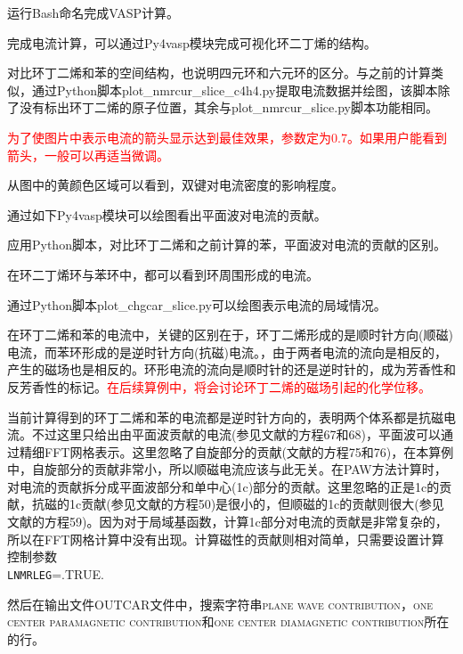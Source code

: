运行\textrm{Bash}命名完成\textrm{VASP}计算。

完成电流计算，可以通过\textrm{Py4vasp}模块完成可视化环二丁烯的结构。

对比环丁二烯和苯的空间结构，也说明四元环和六元环的区分。与之前的计算类似，通过\textrm{Python}脚本\textrm{plot\_nmrcur\_slice\_c4h4.py}提取电流数据并绘图，该脚本除了没有标出环丁二烯的原子位置，其余与\textrm{plot\_nmrcur\_slice.py}脚本功能相同。

\textcolor{red}{为了使图片中表示电流的箭头显示达到最佳效果，参数定为\textsc{0.7}。如果用户能看到箭头，一般可以再适当微调。}

从图中的黄颜色区域可以看到，双键对电流密度的影响程度。

通过如下\textrm{Py4vasp}模块可以绘图看出平面波对电流的贡献。

应用\textrm{Python}脚本，对比环丁二烯和之前计算的苯，平面波对电流的贡献的区别。

在环二丁烯环与苯环中，都可以看到环周围形成的电流。

通过\textrm{Python}脚本\textrm{plot\_chgcar\_slice.py}可以绘图表示电流的局域情况。

在环丁二烯和苯的电流中，关键的区别在于，环丁二烯形成的是顺时针方向(顺磁)电流，而苯环形成的是逆时针方向(抗磁)电流。，由于两者电流的流向是相反的，产生的磁场也是相反的。环形电流的流向是顺时针的还是逆时针的，成为芳香性和反芳香性的标记。\textcolor{red}{在后续算例中，将会讨论环丁二烯的磁场引起的化学位移。}

当前计算得到的环丁二烯和苯的电流都是逆时针方向的，表明两个体系都是抗磁电流。不过这里只给出由平面波贡献的电流(参见文献\cite{ArXiv2504.17380}的方程67和68)，平面波可以通过精细\textrm{FFT}网格表示。这里忽略了自旋部分的贡献(文献\cite{ArXiv2504.17380}的方程75和76)，在本算例中，自旋部分的贡献非常小，所以顺磁电流应该与此无关。在\textrm{PAW}方法计算时，对电流的贡献拆分成平面波部分和单中心\textrm{(1c)}部分的贡献。这里忽略的正是\textrm{1c}的贡献，抗磁的\textrm{1c}贡献(参见文献\cite{ArXiv2504.17380}的方程50)是很小的，但顺磁的\textrm{1c}的贡献则很大(参见文献\cite{ArXiv2504.17380}的方程59)。因为对于局域基函数，计算\textrm{1c}部分对电流的贡献是非常复杂的，所以在\textrm{FFT}网格计算中没有出现。计算磁性的贡献则相对简单，只需要设置计算控制参数\\
\texttt{LNMRLEG}=\textrm{.TRUE.}

然后在输出文件\textrm{OUTCAR}文件中，搜索字符串\textsc{plane wave contribution}，\textsc{one center paramagnetic contribution}和\textsc{one center diamagnetic contribution}所在的行。

